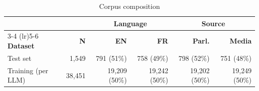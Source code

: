 \begin{table}[h!]
\centering
\caption{Corpus composition}
\label{tab:corpus_stats}
\small
\begin{tabular}{lrrrrr}
\toprule
& & \multicolumn{2}{c}{\textbf{Language}} & \multicolumn{2}{c}{\textbf{Source}} \\
\cmidrule(lr){3-4} \cmidrule(lr){5-6}
\textbf{Dataset} & \textbf{N} & \textbf{EN} & \textbf{FR} & \textbf{Parl.} & \textbf{Media} \\
\midrule
Test set & 1,549 & 791 (51\%) & 758 (49\%) & 798 (52\%) & 751 (48\%) \\
Training (per LLM) & 38,451 & 19,209 (50\%) & 19,242 (50\%) & 19,202 (50\%) & 19,249 (50\%) \\
\bottomrule
\end{tabular}
\end{table}
